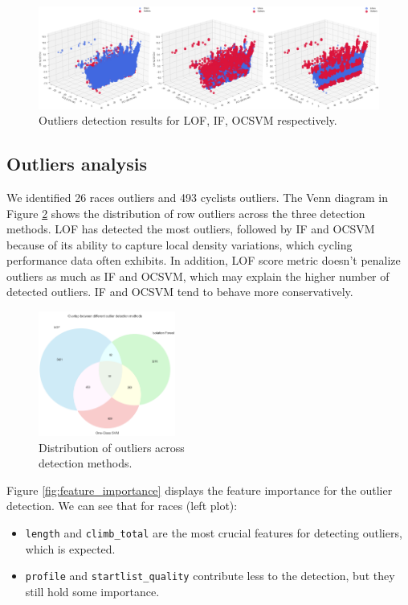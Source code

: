 \documentclass[a4paper, twoside]{article}
\begin{document}
\begin{figure}[ht]
    \centering
    \includegraphics[width=1.0\textwidth]{assets/outliers_det1.png}
    \caption{Outliers detection results for LOF, IF, OCSVM respectively.}
    \label{fig:outliers_det1}
\end{figure}
\subsection{Outliers analysis}
We identified 26 races outliers and 493 cyclists outliers.
The Venn diagram in Figure \ref{fig:outliers_venn} shows the distribution of row outliers across the three detection methods. LOF has detected the most outliers, followed by IF and OCSVM because of its ability to capture local density variations, which cycling performance data often exhibits.
In addition, LOF score metric doesn't penalize outliers as much as IF and OCSVM, which may explain the higher number of detected outliers. IF and OCSVM tend to behave more conservatively.
\begin{figure}[ht]
    \centering
    \includegraphics[width=0.4\textwidth]{assets/outliers_venn.png}%
    \caption{Distribution of outliers across \\ detection methods.}%
    \label{fig:outliers_venn}%
\end{figure}%
Figure \ref{fig:feature_importance} displays the feature importance for the outlier detection. We can see that for races (left plot):
\begin{itemize}
    \item \texttt{length} and \texttt{climb\_total} are the most crucial features for detecting outliers, which is expected.
    \item \texttt{profile} and \texttt{startlist\_quality} contribute less to the detection, but they still hold some importance.
\end{itemize}
\end{document}
